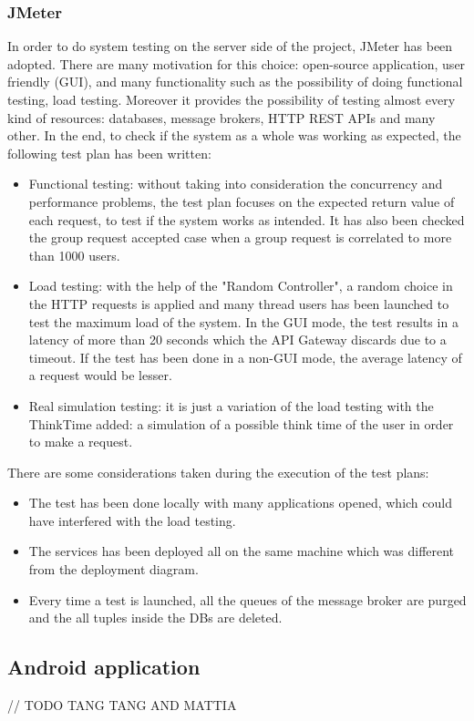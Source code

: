 \subsubsection{JMeter} 
In order to do system testing on the server side of the project, JMeter has been adopted. There are many motivation for this choice: 
open-source application, user friendly (GUI), and many functionality such as the possibility of doing functional testing, load testing. Moreover it provides the possibility of testing almost every kind of resources: databases, message brokers, HTTP REST APIs and 
many other. In the end, to check if the system as a whole was working as expected, the following test plan has been written:
\begin{itemize}
\item Functional testing: without taking into consideration the concurrency and performance problems, the test plan focuses on 
the expected return value of each request, to test if the system works as intended. It has also been checked the group 
request accepted case when a group request is correlated to more than 1000 users.
\item Load testing: with the help of the "Random Controller", a random choice in the HTTP requests is applied and many thread 
users has been launched to test the maximum load of the system. In the GUI mode, the test results in a latency of more than 
20 seconds which the API Gateway discards due to a timeout. If the test has been done in a non-GUI mode, the average latency 
of a request would be lesser.
\item Real simulation testing: it is just a variation of the load testing with the ThinkTime added: a simulation of a possible think time 
of the user in order to make a request.
\end{itemize}
There are some considerations taken during the execution of the test plans:
\begin{itemize}
\item The test has been done locally with many applications opened, which could have interfered with the load testing.
\item The services has been deployed all on the same machine which was different from the deployment diagram.
\item Every time a test is launched, all the queues of the message broker are purged and the all tuples inside the DBs are deleted.
\end{itemize}


\subsection{Android application}
// TODO TANG TANG AND MATTIA 
